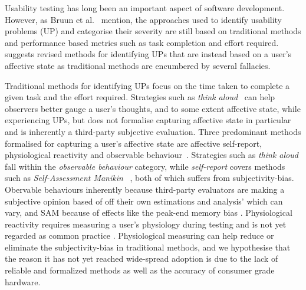 Usability testing has long been an important aspect of software development.
However, as Bruun et al.~\cite{LH-paper} mention, the approaches used to
identify usability problems (UP) and categorise their severity are still based
on traditional methods and performance based metrics such as task completion and effort required. \cite{LH-paper} suggests revised methods
for identifying UPs that are instead based on a user's affective state as
traditional methods are encumbered by several fallacies.


Traditional methods for identifying UPs focus on the time taken to complete a
given task and the effort required. Strategies such as \textit{think
aloud}~\cite{use_of_TA_and_IDA} can help observers better gauge a user's
thoughts, and to some extent affective state, while experiencing UPs, but does
not formalise capturing affective state in particular and is inherently a third-party
subjective evaluation. Three predominant methods formalised for capturing a
user's affective state are affective self-report, physiological reactivity and
observable behaviour~\cite{BRADLEY199449}. Strategies such as \textit{think
aloud} fall within the \textit{observable behaviour} category, while
\textit{self-report} covers methods such as \textit{Self-Assessment Manikin}
~\cite{BRADLEY199449}, both of which suffers from 
subjectivity-bias. Obervable behaviours inherently because third-party evaluators are making a subjective opinion based of off their own estimations and analysis' which can vary\cite{eval_effect}, and SAM because of effects like the peak-end memory bias \cite{cockburn_peakend}. Physiological reactivity requires measuring a
user's physiology during testing and is not yet regarded as common practice
.  Physiological measuring can help reduce or
eliminate the subjectivity-bias in traditional methods, and we hypothesise that
the reason it has not yet reached wide-spread adoption is due to the lack of
reliable and formalized methods as well as the accuracy of consumer grade hardware.

